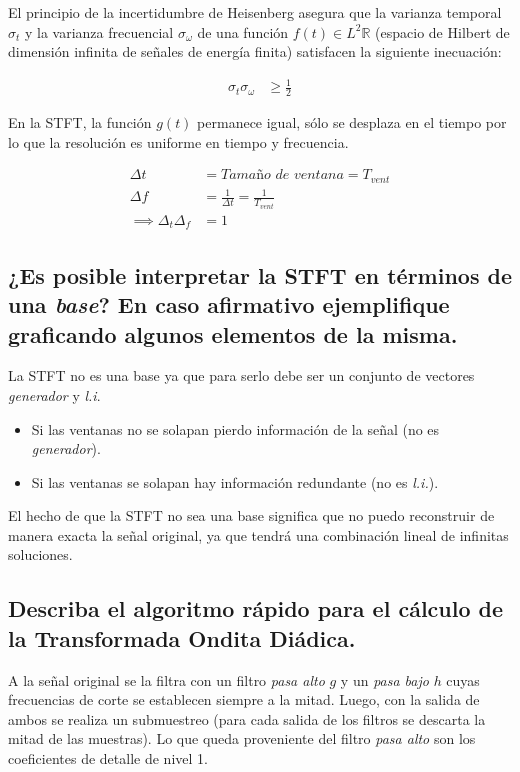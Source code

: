 \documentclass[a4paper,10pt,spanish,oneside]{article}
\begin{document}
El principio de la incertidumbre de Heisenberg asegura que la varianza temporal $\sigma_{t}$ y la varianza frecuencial $\sigma_{\omega}$ de una función $f(t)\in L^{2}\mathbb{R}$ (espacio de Hilbert de dimensión infinita de señales de energía finita) satisfacen la siguiente inecuación:

\begin{align*}
\sigma_{t}\sigma_{\omega} &\geq \frac{1}{2}
\end{align*}

En la STFT, la función $g(t)$ permanece igual, sólo se desplaza en el tiempo por lo que la resolución es uniforme en tiempo y frecuencia.

\begin{align*}
\Delta t &= \textit{Tamaño de ventana}=T_{vent} \\
\Delta f &= \frac{1}{\Delta t}=\frac{1}{T_{vent}} \\
\implies\Delta_{t}\Delta_{f} &= 1
\end{align*}

\subsection{¿Es posible interpretar la STFT en términos de una \textit{base}? En caso afirmativo ejemplifique graficando algunos elementos de la misma.}

La STFT no es una base ya que para serlo debe ser un conjunto de vectores \textit{generador} y \textit{l.i}.

\begin{itemize}
\item Si las ventanas no se solapan pierdo información de la señal (no es \textit{generador}).

\item Si las ventanas se solapan hay información redundante (no es \textit{l.i.}).
\end{itemize}

El hecho de que la STFT no sea una base significa que no puedo reconstruir de manera exacta la señal original, ya que tendrá una combinación lineal de infinitas soluciones.


\subsection{Describa el algoritmo rápido para el cálculo de la Transformada Ondita Diádica.}

A la señal original se la filtra con un filtro \textit{pasa alto} $g$ y un \textit{pasa bajo} $h$ cuyas frecuencias de corte se establecen siempre a la mitad. Luego, con la salida de ambos se realiza un submuestreo (para cada salida de los filtros se descarta la mitad de las muestras). Lo que queda proveniente del filtro \textit{pasa alto} son los coeficientes de detalle de nivel 1.
\end{document}
